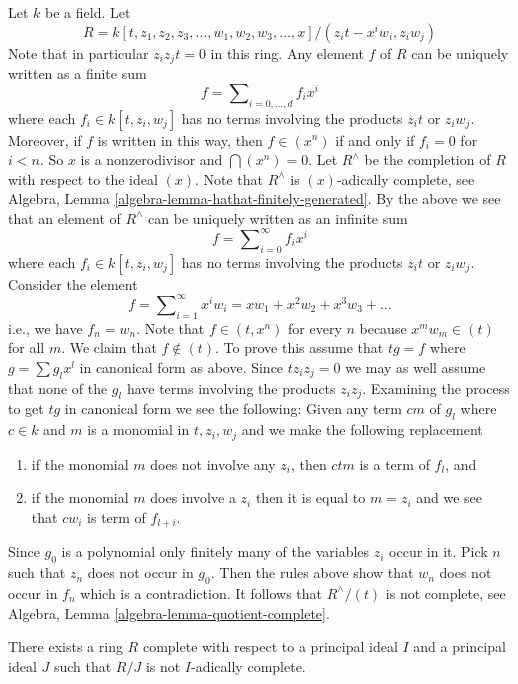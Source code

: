 \noindent
Let $k$ be a field. Let
$$
R = k[t, z_1, z_2, z_3, \ldots, w_1, w_2, w_3, \ldots, x]/
(z_it - x^iw_i, z_i w_j)
$$
Note that in particular $z_iz_jt = 0$ in this ring. Any element $f$ of $R$
can be uniquely written as a finite sum
$$
f = \sum\nolimits_{i = 0, \ldots, d} f_i x^i
$$
where each $f_i \in k[t, z_i, w_j]$ has no terms involving the products
$z_it$ or $z_iw_j$. Moreover, if $f$ is written in this way, then
$f \in (x^n)$ if and only if $f_i = 0$ for $i < n$.
So $x$ is a nonzerodivisor and $\bigcap (x^n) = 0$.
Let $R^\wedge$ be the completion of $R$ with respect to the ideal $(x)$.
Note that $R^\wedge$ is $(x)$-adically complete, see
Algebra, Lemma \ref{algebra-lemma-hathat-finitely-generated}.
By the above we see that an element of $R^\wedge$ can be uniquely written
as an infinite sum
$$
f = \sum\nolimits_{i = 0}^\infty f_i x^i
$$
where each $f_i \in k[t, z_i, w_j]$ has no terms involving the products
$z_it$ or $z_iw_j$. Consider the element
$$
f = \sum\nolimits_{i = 1}^\infty x^i w_i =
xw_1 + x^2w_2 + x^3w_3 + \ldots
$$
i.e., we have $f_n = w_n$. Note that $f \in (t , x^n)$ for every $n$
because $x^mw_m \in (t)$ for all $m$.
We claim that $f \not \in (t)$. To prove this assume that
$tg = f$ where $g = \sum g_lx^l$ in canonical form as above.
Since $tz_iz_j = 0$ we may as well assume that none of the $g_l$ have
terms involving the products $z_iz_j$. Examining the process to
get $tg$ in canonical form we see the following:
Given any term $c m$ of $g_l$ where $c \in k$ and $m$ is a
monomial in $t, z_i, w_j$ and we make the following replacement
\begin{enumerate}
\item if the monomial $m$ does not involve any $z_i$, then $ctm$ is
a term of $f_l$, and
\item if the monomial $m$ does involve a $z_i$ then it is equal to
$m = z_i$ and we see that $cw_i$ is term of $f_{l + i}$.
\end{enumerate}
Since $g_0$ is a polynomial only finitely many of the variables $z_i$
occur in it. Pick $n$ such that $z_n$ does not occur in $g_0$.
Then the rules above show that $w_n$ does not occur in $f_n$ which is
a contradiction. It follows that $R^\wedge/(t)$ is not complete, see
Algebra, Lemma \ref{algebra-lemma-quotient-complete}.

\begin{lemma}
\label{lemma-noncomplete-quotient}
There exists a ring $R$ complete with respect to a principal ideal
$I$ and a principal ideal $J$ such that $R/J$ is not $I$-adically
complete.
\end{lemma}

